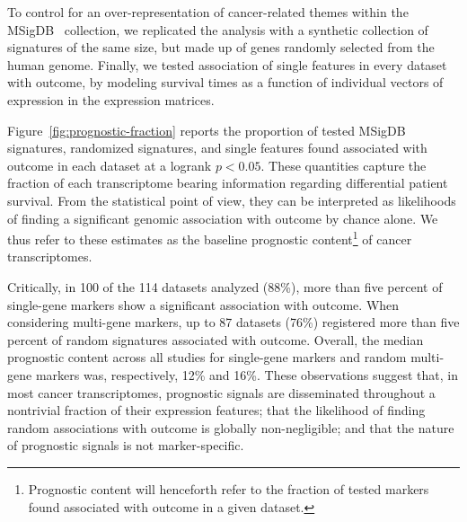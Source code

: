 To control for an over-representation of cancer-related themes within the
\mbox{MSigDB } collection, we replicated the analysis with a
synthetic collection of signatures of the same size, but made up of genes
randomly selected from the human genome.  Finally, we tested association of
single features in every dataset with outcome, by modeling survival times as a
function of individual vectors of expression in the expression matrices.

Figure~\ref{fig:prognostic-fraction} reports the proportion of tested
\mbox{MSigDB } signatures, randomized signatures, and single
features found associated with outcome in each dataset at a logrank $p<0.05$.
These quantities capture the fraction of each transcriptome bearing information
regarding differential patient survival.  From the statistical point of view,
they can be interpreted as likelihoods of finding a significant genomic
association with outcome by chance alone.  We thus refer to these estimates as
the baseline prognostic content\footnote{Prognostic content will henceforth
  refer to the fraction of tested markers found associated with outcome in a
  given dataset.} of cancer transcriptomes.

Critically, in 100 of the 114 datasets analyzed (88\%), more than five percent
of single-gene markers show a significant association with outcome.  When
considering multi-gene markers, up to 87 datasets (76\%) registered more than
five percent of random signatures associated with outcome.  Overall, the median
prognostic content across all studies for single-gene markers and random
multi-gene markers was, respectively, 12\% and 16\%.  These observations suggest
that, in most cancer transcriptomes, prognostic signals are disseminated
throughout a nontrivial fraction of their expression features; that the
likelihood of finding random associations with outcome is globally
non-negligible; and that the nature of prognostic signals is not
marker-specific.


